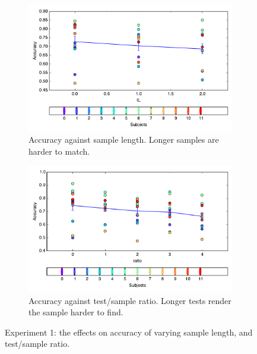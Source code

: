 \begin{figure}[htp]
\centering
\begin{subfigure}[b]{\textwidth}
\centering
                \includegraphics[width=12cm]{img/fig_fire3_correct_tL.pdf}
                \caption{Accuracy against sample length. Longer samples are harder to match.}
          
        \end{subfigure}
\begin{subfigure}[b]{\textwidth}
\centering
                \includegraphics[width=12cm]{img/fig_fire3_correct_ratio.pdf}
                \caption{Accuracy against test/sample ratio. Longer tests render the sample harder to find.}
         
        \end{subfigure}
\caption{Experiment 1: the effects on accuracy of varying sample length, and test/sample ratio.}
\end{figure}

